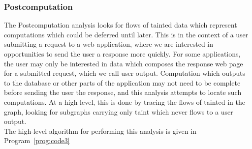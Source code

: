 \documentclass[msc,oneside]{ubcthesis}
\begin{document}
\subsubsection{Postcomputation}
The Postcomputation analysis looks for flows of tainted data which represent computations which could be deferred until later. This is in the context of a user submitting a request to a web application, where we are interested in opportunities to send the user a response more quickly. For some applications, the user may only be interested in data which composes the response web page for a submitted request, which we call user output. Computation which outputs to the database or other parts of the application may not need to be complete before sending the user the response, and this analysis attempts to locate such computations. At a high level, this is done by tracing the flows of tainted in the graph, looking for subgraphs carrying only taint which never flows to a user output.\\

The high-level algorithm for performing this analysis is given in Program~\ref{prog:code3}
\end{document}

